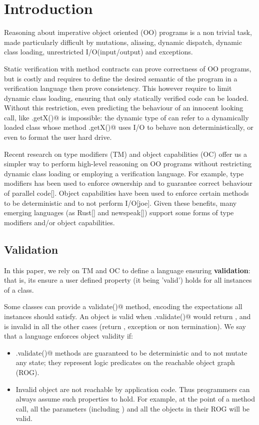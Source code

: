 
\section{Introduction}
\saveSpace\saveSpace
Reasoning about imperative object oriented (OO) programs is a non trivial task,
made particularly difficult by mutations, aliasing, dynamic dispatch, dynamic class loading,
unrestricted I/O(input/output) and exceptions.

Static verification with method contracts can prove correctness of OO programs, but is costly and requires to define the desired semantic of the program in a verification language then prove consistency.
This however require to limit dynamic class loading, ensuring that only statically verified code can be loaded.
Without this restriction, even predicting the behaviour of an innocent looking call, like 
\Q@myPoint.getX()@ is impossible: the dynamic type of \Q@myPoint@ can refer to a dynamically loaded class
whose method \Q@.getX()@ uses I/O to behave non deterministically, or even to format the user hard drive.

Recent research on type modifiers (TM) and object capabilities (OC) offer us a simpler way to perform high-level reasoning on OO programs without restricting dynamic class loading or employing a verification language.
For example, type modifiers has been used to enforce ownership and to guarantee correct behaviour of
parallel code[]. Object capabilities have been used to enforce certain methods to be deterministic and to not perform I/O[joe].
Given these benefits, many emerging languages (as Rust[] and newspeak[])
support some forms of type modifiers and/or object capabilities.

\loseSpace

\subsection{Validation}
In this paper, we rely on TM and OC to define a language ensuring \textbf{validation}: that is, its ensure a user defined property (it being 'valid') holds for all instances of a class.

Some classes can provide a \Q@Bool validate()@ method, encoding the expectations
all instances should satisfy.
An object \Q@o@ is valid when \Q@o.validate()@ would return \Q@true@, and is invalid in all the other cases (return \Q@false@, exception or non termination).
We say that a language enforces object validity if:
\begin{itemize}
\item \Q@.validate()@ methods are guaranteed to be deterministic and to not mutate any state; they represent logic predicates on the reachable object graph (ROG).
\item Invalid object are not reachable by application code. Thus programmers can always assume such properties to hold.
For example, at the point of a method call,
all the parameters (including \Q@this@) and all the objects in their ROG will be valid.
\end{itemize}

